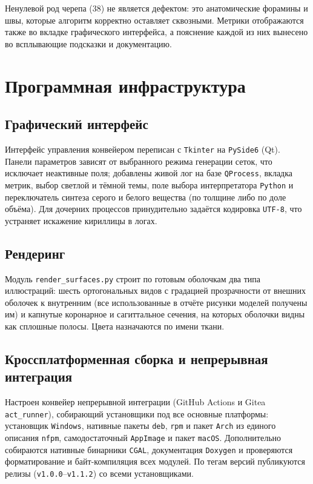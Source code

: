 \documentclass[a4paper,14pt]{article}
\begin{document}
Ненулевой род черепа ($38$) не является дефектом: это анатомические форамины и швы, которые алгоритм корректно оставляет сквозными. Метрики отображаются также во вкладке графического интерфейса, а пояснение каждой из них вынесено во всплывающие подсказки и документацию.

\newpage
\section{Программная инфраструктура}

\subsection{Графический интерфейс}
Интерфейс управления конвейером переписан с \texttt{Tkinter} на \texttt{PySide6} (Qt). Панели параметров зависят от выбранного режима генерации сеток, что исключает неактивные поля; добавлены живой лог на базе \texttt{QProcess}, вкладка метрик, выбор светлой и тёмной темы, поле выбора интерпретатора \texttt{Python} и переключатель синтеза серого и белого вещества (по толщине либо по доле объёма). Для дочерних процессов принудительно задаётся кодировка \texttt{UTF-8}, что устраняет искажение кириллицы в логах.

\subsection{Рендеринг}
Модуль \texttt{render\_surfaces.py} строит по готовым оболочкам два типа иллюстраций: шесть ортогональных видов с градацией прозрачности от внешних оболочек к внутренним (все использованные в отчёте рисунки моделей получены им) и капнутые коронарное и сагиттальное сечения, на которых оболочки видны как сплошные полосы. Цвета назначаются по имени ткани.

\subsection{Кроссплатформенная сборка и непрерывная интеграция}
Настроен конвейер непрерывной интеграции (GitHub Actions и Gitea \texttt{act\_runner}), собирающий установщики под все основные платформы: установщик \texttt{Windows}, нативные пакеты \texttt{deb}, \texttt{rpm} и пакет \texttt{Arch} из единого описания \texttt{nfpm}, самодостаточный \texttt{AppImage} и пакет \texttt{macOS}. Дополнительно собираются нативные бинарники \texttt{CGAL}, документация \texttt{Doxygen} и проверяются форматирование и байт-компиляция всех модулей. По тегам версий публикуются релизы (\texttt{v1.0.0}--\texttt{v1.1.2}) со всеми установщиками.
\end{document}
